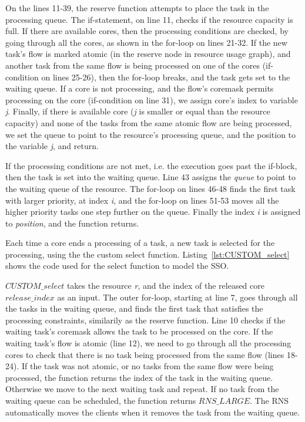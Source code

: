 On the lines 11-39, the reserve function attempts to place the task in the processing queue. The if-statement, on line 11, checks if the resource capacity is full. If there are available cores, then the processing conditions are checked, by going through all the cores, as shown in the for-loop on lines 21-32. If the new task's flow is marked atomic (in the reserve node in resource usage graph), and another task from the same flow is being processed on one of the cores (if-condition on lines 25-26), then the for-loop breaks, and the task gets set to the waiting queue. If a core is not processing, and the flow's coremask permits processing on the core (if-condition on line 31), we assign core's index to variable \emph{j}. Finally, if there is available core (\emph{j} is smaller or equal than the resource capacity) and none of the tasks from the same atomic flow are being processed, we set the queue to point to the resource's processing queue, and the position to the variable \emph{j}, and return.

If the processing conditions are not met, i.e. the execution goes past the if-block, then the task is set into the waiting queue. Line 43 assigns the \emph{queue} to point to the waiting queue of the resource. The for-loop on lines 46-48 finds the first task with larger priority, at index \emph{i}, and the for-loop on lines 51-53 moves all the higher priority tasks one step further on the queue. Finally the index \emph{i} is assigned to \emph{position}, and the function returns.

Each time a core ends a processing of a task, a new task is selected for the processing, using the the custom select function. Listing~\ref{lst:CUSTOM_select} shows the code used for the select function to model the SSO.



$CUSTOM\_select$ takes the resource \emph{r}, and the index of the released core \emph{$release\_index$} as an input. The outer for-loop, starting at line 7, goes through all the tasks in the waiting queue, and finds the first task that satisfies the processing constraints, similarily as the reserve function. Line 10 checks if the waiting task's coremask allows the task to be processed on the core. If the waiting task's flow is atomic (line 12), we need to go through all the processing cores to check that there is no task being processed from the same flow (lines 18-24). If the task was not atomic, or no tasks from the same flow were being processed, the function returns the index of the task in the waiting queue. Otherwise we move to the next waiting task and repeat. If no task from the waiting queue can be scheduled, the function returns $RNS\_LARGE$. The RNS automatically moves the clients when it removes the task from the waiting queue.

